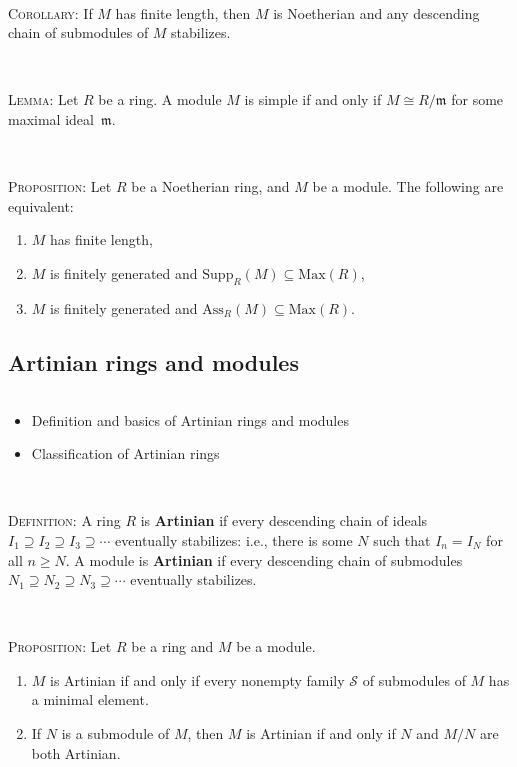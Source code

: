 \documentclass[12pt]{amsart}
\newcommand{\m}{\mathfrak{m}}
\newcommand{\Max}{\mathrm{Max}}
\newcommand{\0}{$\phantom{.}$}
\newcommand{\1}{\mathbbm{1}}
\begin{document}
	\
	
	\noindent \textsc{Corollary:} If $M$ has finite length, then $M$ is Noetherian and any descending chain of submodules of $M$ stabilizes.
	
	\
	
	
	\noindent	\textsc{Lemma:} Let $R$ be a ring. A module $M$ is simple if and only if $M\cong R/\m$ for some maximal ideal~$\m$.
	

	
	\
	
	\noindent \textsc{Proposition:} Let $R$ be a Noetherian ring, and $M$ be a module. The following are equivalent:
	\begin{enumerate}
	\item $M$ has finite length,
	\item $M$ is finitely generated and $\mathrm{Supp}_R(M) \subseteq \Max(R)$,
	\item $M$ is finitely generated and $\mathrm{Ass}_R(M) \subseteq \Max(R)$.
	\end{enumerate}
	
	\newpage
	
	\subsection{Artinian rings and modules}  \0

\begin{framed}
\begin{itemize}
\item Definition and basics of Artinian rings and modules
\item Classification of Artinian rings
\end{itemize}
\end{framed}

\
	
		\noindent	 \textsc{Definition:} A ring $R$ is \textbf{Artinian} if every descending chain of ideals $I_1 \supseteq I_2 \supseteq I_3 \supseteq \cdots$ eventually stabilizes: i.e., there is some $N$ such that $I_n=I_N$ for all $n\geq N$. A module is \textbf{Artinian} if every descending chain of submodules $N_1 \supseteq N_2 \supseteq N_3 \supseteq \cdots$ eventually stabilizes.
	
	\
	
	\noindent \textsc{Proposition:} Let $R$ be a ring and $M$ be a module.
	\begin{enumerate}
	\item $M$ is Artinian if and only if every nonempty family $\mathcal{S}$ of submodules of $M$ has a minimal element.
	\item If $N$ is a submodule of $M$, then $M$ is Artinian if and only if $N$ and $M/N$ are both Artinian.
	\end{enumerate}
	
\end{document}

